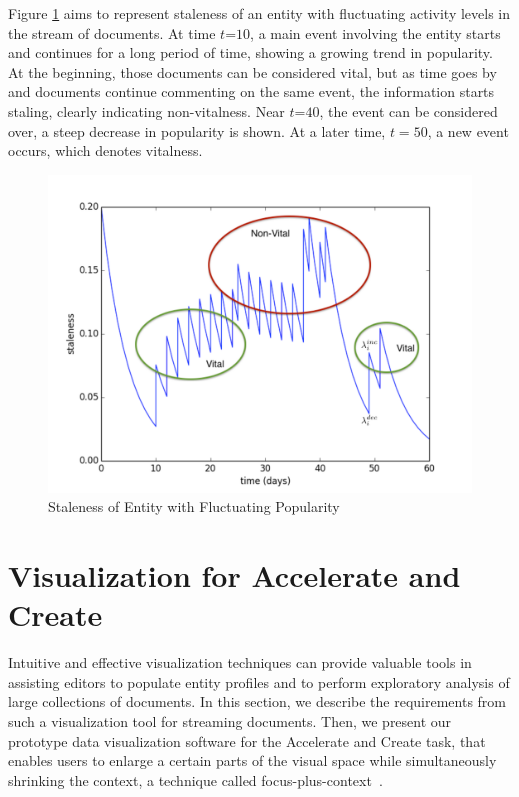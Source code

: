 \documentclass{article}
\begin{document}
Figure \ref{stalenessmedium} aims to represent staleness of an entity with fluctuating activity levels in the stream of documents. At time $t\mathord{=}10$, a main event involving the entity starts and continues for a long period of time, showing a growing trend in popularity. 
At the beginning, those documents can be considered vital, but as time goes by and documents continue commenting on the same event, the information starts staling, clearly indicating non-vitalness.
Near $t\mathord{=}40$, the event can be considered over, a steep decrease in popularity is shown. At a later time, $t=50$, a new event occurs, which denotes vitalness.

\begin{figure}[tb]
\centering
\includegraphics[width=0.7\columnwidth]{fig/staleness2.pdf}
\caption{Staleness of Entity with Fluctuating Popularity}
\label{stalenessmedium}
\end{figure}

\section{Visualization for Accelerate and Create}

Intuitive and effective visualization techniques can provide valuable tools in assisting editors to populate entity profiles and to perform exploratory analysis of large collections of documents. 
In this section, we describe the requirements from such a visualization tool for streaming documents.
Then, we present our prototype data visualization software for the Accelerate and Create task, that enables users to enlarge a certain parts of the visual space while simultaneously shrinking the context, a technique called focus-plus-context~\cite{Artur2010}.
\end{document}
